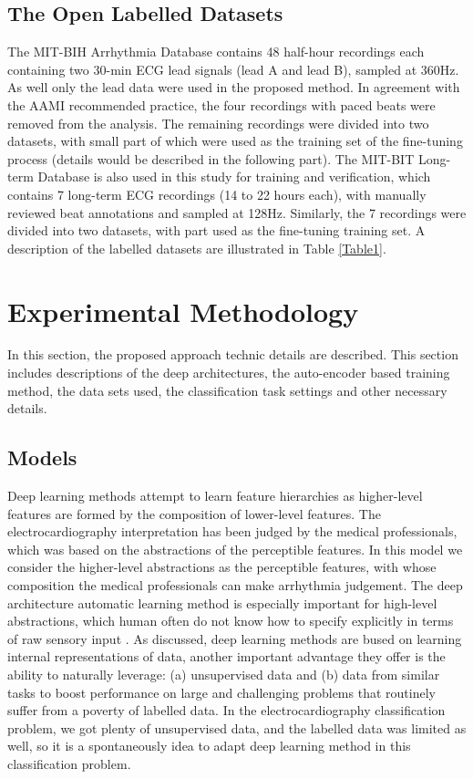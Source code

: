 \documentclass[journal]{IEEEtran}
\begin{document}
\subsection{The Open Labelled Datasets}
The MIT-BIH Arrhythmia Database \cite{physionet} contains 48 half-hour recordings each containing two 30-min ECG lead signals (lead A and lead B), sampled at 360Hz. As well only the  lead \uppercase\expandafter{} data were used in the proposed method. In agreement with the AAMI recommended practice, the four recordings with paced beats were removed from the analysis. The remaining recordings were divided into two datasets, with small part of which were used as the training set of the fine-tuning process (details would be described in the following part).
The MIT-BIT Long-term Database is also used in this study for training and verification, which contains 7 long-term ECG recordings (14 to 22 hours each), with manually reviewed beat annotations and sampled at 128Hz. Similarly, the 7 recordings were divided into two datasets, with part used as the fine-tuning training set. A description of the labelled datasets are illustrated in Table \ref{Table1}.



\section{Experimental Methodology}
In this section, the proposed approach technic details are described. This section includes descriptions of the deep architectures, the auto-encoder based training method, the data sets used, the classification task settings and other necessary details.
\subsection{Models}
Deep learning methods attempt to learn feature hierarchies as higher-level features are formed by the composition of lower-level features. The electrocardiography interpretation has been judged by the medical professionals, which was based on the abstractions of the perceptible features. In this model we consider the higher-level abstractions as the perceptible features, with whose composition the medical professionals can make arrhythmia judgement. The deep architecture automatic learning method is especially important for high-level abstractions, which human often do not know how to specify explicitly in terms of raw sensory input \cite{erhan}. As \cite{collobert} discussed, deep learning methods are bused on learning internal representations of data, another important advantage they offer is the ability to naturally leverage: (a) unsupervised data and (b) data from similar tasks to boost performance on large and challenging problems that routinely suffer from a poverty of labelled data. In the electrocardiography classification problem, we got plenty of unsupervised data, and the labelled data was limited as well, so it is a spontaneously idea to adapt deep learning method in this classification problem.
\end{document}
